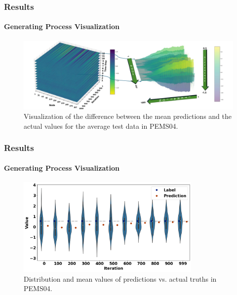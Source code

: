 \documentclass[light]{lutbeamer} %
\begin{document}
\begin{frame}
    \frametitle{Results}
    \framesubtitle{Generating Process Visualization}

    \begin{figure}[ht]
        \centering
        \includegraphics[width=\textwidth]{figures/pems04_3d_waves_plot.pdf}
        \caption{Visualization of the difference between the mean predictions and the actual values for the average test data in PEMS04.}
    \end{figure}
\end{frame}



\begin{frame}
    \frametitle{Results}
    \framesubtitle{Generating Process Visualization}

    \begin{figure}[ht]
        \centering
        \includegraphics[width=0.8\textwidth]{figures/distribution_change_iteration_pems04.png}
        \vspace{-1em}
        \caption{Distribution and mean values of predictions vs. actual truths in PEMS04.}
    \end{figure}
\end{frame}
\end{document}
